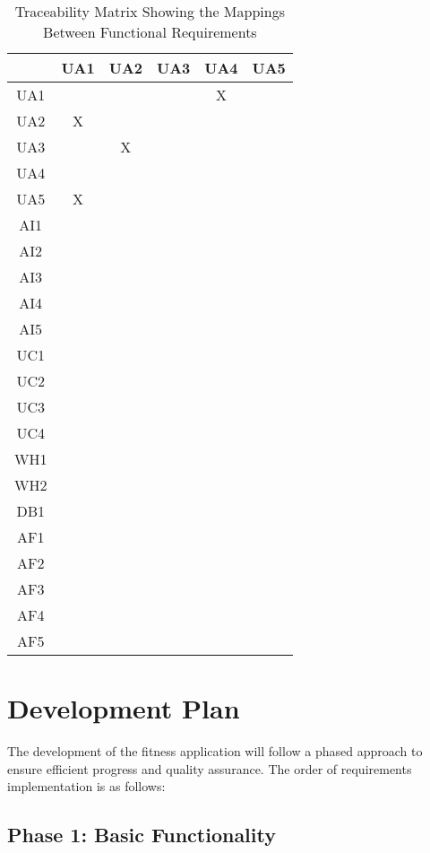 \documentclass[12pt]{article}
\begin{document}
\begin{table}
\centering
\begin{tabular}{|c|c|c|c|c|c|}
 \hline
  & UA1 & UA2 & UA3 & UA4 & UA5 \\
 \hline
 UA1 & & & & X &\\
 \hline
 UA2 & X & & & & \\
 \hline
 UA3 & & X & & & \\
 \hline
 UA4 & & & & & \\
 \hline
 UA5 & X & & & & \\
 \hline
 AI1 & & & & & \\
 \hline
 AI2 & & & & & \\
 \hline
 AI3 & & & & & \\
 \hline
 AI4 & & & & & \\
 \hline
 AI5 & & & & & \\
 \hline
 UC1 & & & & & \\
 \hline
 UC2 & & & & & \\
 \hline
 UC3 & & & & & \\
 \hline
 UC4 & & & & &  \\
 \hline
 WH1 & & & & &  \\
 \hline
 WH2 & & & & & \\
 \hline
 DB1 & & & & &  \\
 \hline
 AF1 & & & & & \\
 \hline
 AF2 & & & & & \\
 \hline
 AF3 & & & & & \\
 \hline
 AF4 & & & & & \\
 \hline
 AF5 & & & & & \\
\hline
\end{tabular}
\caption{Traceability Matrix Showing the Mappings Between Functional Requirements}
\end{table}


\section{Development Plan}

The development of the fitness application will follow a phased approach to ensure efficient progress and quality assurance. The order of requirements implementation is as follows:

\subsection{Phase 1: Basic Functionality}
\end{document}
